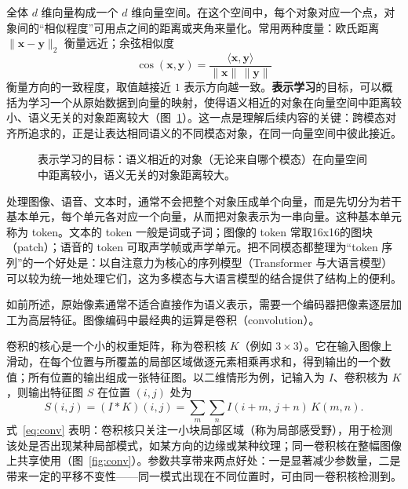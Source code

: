 全体 $d$ 维向量构成一个 $d$ 维向量空间。在这个空间中，每个对象对应一个点，对象间的“相似程度”可用点之间的距离或夹角来量化。常用两种度量：欧氏距离 $\lVert \mathbf{x}-\mathbf{y}\rVert_2$ 衡量远近；余弦相似度
\begin{equation}
  \cos(\mathbf{x},\mathbf{y})=\frac{\langle \mathbf{x},\mathbf{y}\rangle}{\lVert\mathbf{x}\rVert\,\lVert\mathbf{y}\rVert}
\end{equation}
衡量方向的一致程度，取值越接近 $1$ 表示方向越一致。\textbf{表示学习}的目标，可以概括为学习一个从原始数据到向量的映射，使得语义相近的对象在向量空间中距离较小、语义无关的对象距离较大（图~\ref{fig:vecspace}）。这一点是理解后续内容的关键：跨模态对齐所追求的，正是让表达相同语义的不同模态对象，在同一向量空间中彼此接近。

\begin{figure}[htbp]
  \centering
  \caption{表示学习的目标：语义相近的对象（无论来自哪个模态）在向量空间中距离较小，语义无关的对象距离较大。}
  \label{fig:vecspace}
\end{figure}

处理图像、语音、文本时，通常不会把整个对象压成单个向量，而是先切分为若干基本单元，每个单元各对应一个向量，从而把对象表示为一串向量。这种基本单元称为 token。文本的 token 一般是词或子词；图像的 token 常取16x16的图块（patch）；语音的 token 可取声学帧或声学单元。把不同模态都整理为“token 序列”的一个好处是：以自注意力为核心的序列模型（Transformer 与大语言模型）可以较为统一地处理它们，这为多模态与大语言模型的结合提供了结构上的便利。

如前所述，原始像素通常不适合直接作为语义表示，需要一个编码器把像素逐层加工为高层特征。图像编码中最经典的运算是卷积（convolution）。

卷积的核心是一个小的权重矩阵，称为卷积核 $K$（例如 $3\times3$）。它在输入图像上滑动，在每个位置与所覆盖的局部区域做逐元素相乘再求和，得到输出的一个数值；所有位置的输出组成一张特征图。以二维情形为例，记输入为 $I$、卷积核为 $K$，则输出特征图 $S$ 在位置 $(i,j)$ 处为
\begin{equation}
  S(i,j)=(I * K)(i,j)=\sum_{m}\sum_{n} I(i+m,\,j+n)\,K(m,n).
  \label{eq:conv}
\end{equation}
式~\eqref{eq:conv} 表明：卷积核只关注一小块局部区域（称为局部感受野），用于检测该处是否出现某种局部模式，如某方向的边缘或某种纹理；同一卷积核在整幅图像上共享使用（图~\ref{fig:conv}）。参数共享带来两点好处：一是显著减少参数量，二是带来一定的平移不变性——同一模式出现在不同位置时，可由同一卷积核检测到。

